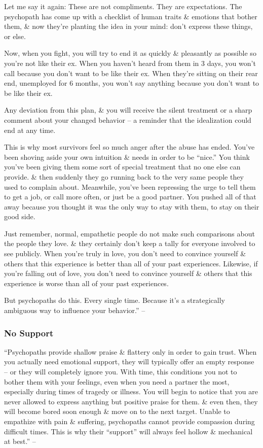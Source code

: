 \documentclass{article}
\numberwithin{equation}{section}
\begin{document}
Let me say it again: These are not compliments. They are expectations. The psychopath has come up with a checklist of human traits \& emotions that bother them, \& now they're planting the idea in your mind: don't express these things, or else.

Now, when you fight, you will try to end it as quickly \& pleasantly as possible so you're not like their ex. When you haven't heard from them in 3 days, you won't call because you don't want to be like their ex. When they're sitting on their rear end, unemployed for 6 months, you won't say anything because you don't want to be like their ex.

Any deviation from this plan, \& you will receive the silent treatment or a sharp comment about your changed behavior -- a reminder that the idealization could end at any time.

This is why most survivors feel so much anger after the abuse has ended. You've been shoving aside your own intuition \& needs in order to be ``nice.'' You think you've been giving them some sort of special treatment that no one else can provide. \& then suddenly they go running back to the very same people they used to complain about. Meanwhile, you've been repressing the urge to tell them to get a job, or call more often, or just be a good partner. You pushed all of that away because you thought it was the only way to stay with them, to stay on their good side.

Just remember, normal, empathetic people do not make such comparisons about the people they love. \& they certainly don't keep a tally for everyone involved to see publicly. When you're truly in love, you don't need to convince yourself \& others that this experience is better than all of your past experiences. Likewise, if you're falling out of love, you don't need to convince yourself \& others that this experience is worse than all of your past experiences.

But psychopaths do this. Every single time. Because it's a strategically ambiguous way to influence your behavior.'' -- \cite[pp. 30--31]{MacKenzie2015}

\subsubsection{No Support}
``Psychopaths provide shallow praise \& flattery only in order to gain trust. When you actually need emotional support, they will typically offer an empty response -- or they will completely ignore you. With time, this conditions you not to bother them with your feelings, even when you need a partner the most, especially during times of tragedy or illness. You will begin to notice that you are never allowed to express anything but positive praise for them. \& even then, they will become bored soon enough \& move on to the next target. Unable to empathize with pain \& suffering, psychopaths cannot provide compassion during difficult times. This is why their ``support'' will always feel hollow \& mechanical at best.'' -- \cite[p. 31]{MacKenzie2015}
\end{document}
